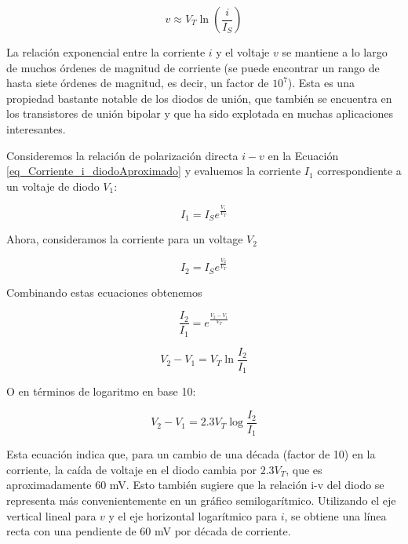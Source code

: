 \[ v \approx V_T \ln \left( \frac{i}{I_S} \right) \]

La relación exponencial entre la corriente \( i \) y el voltaje \( v \) se mantiene a lo largo de muchos órdenes de magnitud de corriente (se puede encontrar un rango de hasta siete órdenes de magnitud, es decir, un factor de \( 10^7 \)). Esta es una propiedad bastante notable de los diodos de unión, que también se encuentra en los transistores de unión bipolar y que ha sido explotada en muchas aplicaciones interesantes.

Consideremos la relación de polarización directa \( i-v \) en la Ecuación \ref{eq_Corriente_i_diodoAproximado} y evaluemos la corriente \( I_1 \) correspondiente a un voltaje de diodo \( V_1 \):

\[ I_1 = I_S  e^{\frac{V_1}{V_T}} \]

Ahora, consideramos la corriente para un voltage $V_2$

\[ I_2 = I_S  e^{\frac{V_2}{V_T}} \]

Combinando estas ecuaciones obtenemos 

\begin{equation*}
\frac{I_2}{I_1} = e^{\frac{V_2-V_1}{V_T}}
\end{equation*}

\begin{equation*}
V_2-V_1 = V_T \ln{\frac{I_2}{I_1}}
\end{equation*}

O en términos de logaritmo en base 10:

\begin{equation*}
V_2-V_1 = 2.3 V_T \log{\frac{I_2}{I_1}}
\end{equation*}

Esta ecuación indica que, para un cambio de una década (factor de 10) en la corriente, la caída de voltaje en el diodo cambia por \(2.3V_T\), que es aproximadamente 60 mV. Esto también sugiere que la relación i-v del diodo se representa más convenientemente en un gráfico semilogarítmico. Utilizando el eje vertical lineal para \( v \) y el eje horizontal logarítmico para \( i \), se obtiene una línea recta con una pendiente de 60 mV por década de corriente.

